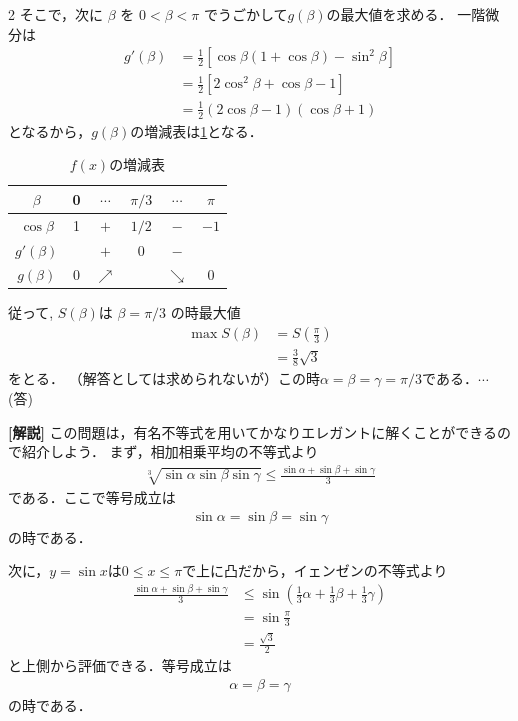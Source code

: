 \documentclass[../../../../main.tex]{subfiles}
\begin{document}
\begin{multicols}{2}
  そこで，次に $\beta$ を $0 < \beta < \pi$ でうごかして$g(\beta)$の最大値を求める．
  一階微分は
  \begin{align*}
    g'(\beta)
     & = \frac{1}{2}\left[\cos\beta(1+\cos\beta)-\sin^2\beta\right] \\
     & = \frac{1}{2}\left[2\cos^2\beta + \cos \beta -1\right]       \\
     & = \frac{1}{2}(2\cos\beta-1)(\cos\beta+1)
  \end{align*}
  となるから，$g(\beta)$の増減表は\cref{1999-2:table:1}となる．

  \begin{table}[H]
    \centering
    \caption{$f(x)$の増減表}
    \label{1999-2:table:1}
    \begin{tabular}{|c||c|c|c|c|c|}
      \hline
      $\beta$     & 0 & $\cdots$   & $\pi/3$ & $\cdots$   & $\pi$ \\
      \hline
      $\cos\beta$ & 1 & $+$        & $1/2$   & $-$        & $-1$  \\
      \hline
      $g'(\beta)$ &   & $+$        & 0       & $-$        &       \\
      \hline
      $g(\beta)$  & 0 & $\nearrow$ &         & $\searrow$ & 0     \\
      \hline
    \end{tabular}
  \end{table}

  従って, $S(\beta)$は $\beta = \pi/3$ の時最大値
  \begin{align*}
    \max S(\beta)
     & = S\left(\frac{\pi}{3}\right) \\
     & = \frac{3}{8}\sqrt{3}
  \end{align*}
  をとる．
  （解答としては求められないが）この時$\alpha = \beta = \gamma = \pi/3$である．$\cdots$(答)

  \vspace{10pt}
  {\bf[解説]}
  この問題は，有名不等式を用いてかなりエレガントに解くことができるので紹介しよう．
  まず，相加相乗平均の不等式より
  \begin{align*}
    \sqrt[3]{\sin\alpha\sin\beta\sin\gamma} \le \frac{\sin\alpha+\sin\beta+\sin\gamma}{3}
  \end{align*}
  である．ここで等号成立は
  \begin{align*}
    \sin\alpha=\sin\beta=\sin\gamma
  \end{align*}
  の時である．

  次に，$y=\sin x$は$0\le x\le \pi$で上に凸だから，イェンゼンの不等式より
  \begin{align*}
    \frac{\sin\alpha+\sin\beta+\sin\gamma}{3}
     & \le \sin\left(\frac{1}{3}\alpha+\frac{1}{3}\beta+\frac{1}{3}\gamma\right) \\
     & = \sin\frac{\pi}{3}                                                       \\
     & = \frac{\sqrt{3}}{2}
  \end{align*}
  と上側から評価できる．等号成立は
  \begin{align*}
    \alpha=\beta=\gamma
  \end{align*}
  の時である．


\end{multicols}
\end{document}
